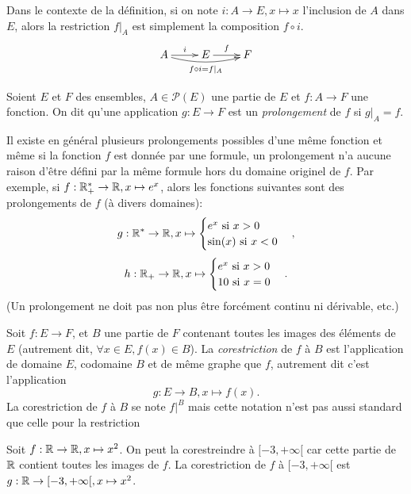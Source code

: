 \begin{remarque}
Dans le contexte de la définition, si on note $i : A\to E, x\mapsto x$ l'inclusion de $A$ dans $E$, alors la restriction $f|_A$ est simplement la composition $f\circ i$.
\[\xymatrix{
A \ar[r]^{i} \ar@/_/[rr]_{f\circ i = f|_A} & E \ar[r]^f & F
}\]
\end{remarque}

\begin{definition}[Prolongement]
Soient $E$ et $F$ des ensembles, $A\in \mathcal P(E)$ une partie de $E$ et $f : A\to F$ une fonction. On dit qu'une application $g : E\to F$ est un \emph{prolongement} de $f$ si $g|_A = f$.
\end{definition}

\begin{attention}
Il existe en général plusieurs prolongements possibles d'une même fonction et même si la fonction $f$ est donnée par une formule, un prolongement n'a aucune raison d'être défini par la même formule hors du domaine originel de $f$. Par exemple, si $f : \mathbb{R}_+^* \to \mathbb{R}, x\mapsto e^x$, alors les fonctions suivantes  sont des prolongements de $f$ (à divers domaines):
\[g : \mathbb{R}^* \to \mathbb{R}, x\mapsto \begin{cases}e^x\text{ si } x>0\\ \sin(x) \text{ si } x<0\end{cases},\]
\[h : \mathbb{R}_+ \to \mathbb{R}, x\mapsto \begin{cases}e^x\text{ si } x>0\\ 10 \text{ si }x=0\end{cases}.\]
(Un prolongement ne doit pas non plus être forcément continu ni dérivable, etc.)
\end{attention}


\begin{definition}[Corestriction]\label{def-corestriction}
Soit $f : E\to F$, et $B$ une partie de $F$ contenant toutes les images des éléments de $E$ (autrement dit, $\forall x\in E, f(x)\in B$).
La \emph{corestriction} de $f$ à $B$ est l'application de domaine $E$, codomaine $B$ et de même graphe que $f$, autrement dit c'est l'application 
\[ g : E\to B, x\mapsto f(x).\]
La corestriction de $f$ à $B$ se note $f|^{B}$ mais cette notation n'est pas aussi standard que celle pour la restriction
\end{definition}

\begin{exemple}
Soit $f : \mathbb{R}\to \mathbb{R}, x\mapsto x^2$. On peut la corestreindre à $[-3,+\infty[$ car cette partie de $\mathbb{R}$ contient toutes les images de $f$. La corestriction de $f$ à $[-3,+\infty[$ est $g : \mathbb{R}\to [-3,+\infty[, x\mapsto x^2$.
\end{exemple}





